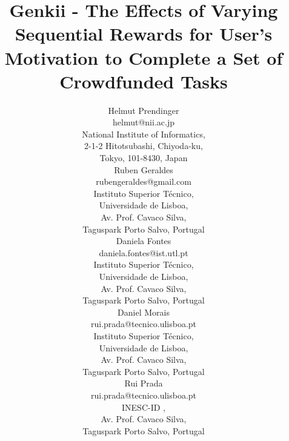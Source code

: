 \documentclass[letterpaper]{article}
\begin{document}
 
%
\title{Genkii - The Effects of Varying Sequential Rewards for User's Motivation to Complete a Set of Crowdfunded Tasks}
\author{Helmut Prendinger \\
helmut@nii.ac.jp\\
National Institute of Informatics,\\
2-1-2 Hitotsubashi, Chiyoda-ku, \\ Tokyo, 101-8430, Japan \\ 
\And Ruben Geraldes \\
rubengeraldes@gmail.com \\
Instituto Superior T\'{e}cnico, \\ Universidade de Lisboa,\\
	Av. Prof. Cavaco Silva, \\ Taguspark Porto Salvo, Portugal\\ 
	\And Daniela Fontes\\
	daniela.fontes@ist.utl.pt \\
	Instituto Superior T\'{e}cnico, \\ Universidade de Lisboa,\\
	Av. Prof. Cavaco Silva, \\ Taguspark Porto Salvo, Portugal\\
	\AND Daniel Morais\\
	rui.prada@tecnico.ulisboa.pt\\
	Instituto Superior T\'{e}cnico, \\ Universidade de Lisboa,\\
	Av. Prof. Cavaco Silva, \\ Taguspark Porto Salvo, Portugal\\
	\And Rui Prada\\
	rui.prada@tecnico.ulisboa.pt\\
	INESC-ID ,\\
	Av. Prof. Cavaco Silva, \\ Taguspark Porto Salvo, Portugal\\		
}



\maketitle

\end{document}
